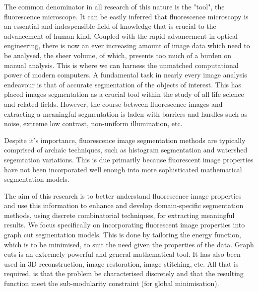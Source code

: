 The common denominator in all research of this nature is the "tool", the fluorescence microscope. 
It can be easily inferred that fluorescence microscopy is an essential and indespensible field of knowledge that is crucial to the advancement of human-kind. 
Coupled with the rapid advancement in optical engineering, there is now an ever increasing amount of image data which need to be analysed, the sheer volume, of which, presents too much of a burden on manual analysis. 
This is where we can harness the unmatched computational power of modern computers. 
A fundamental task in nearly every image analysis endeavour is that of accurate segmentation of the objects of interest. 
This has placed images segmentation as a crucial tool within the study of all life science and related fields. 
However, the course between fluorescence images and extracting a meaningful segmentation is laden with barriers and hurdles such as noise, extreme low contrast, non-uniform illumination, etc.

Despite it's importance, fluorescence image segmentation methods are typically comprised of archaic techniques, such as histogram segmentation and watershed segemtation variations. 
This is due primarily because fluorescent image properties have not been incorporated well enough into more sophisticated mathematical segmentation models. 

The aim of this research is to better understand fluorescence image properties and use this information
to enhance and develop domain-specific segmentation methods, using discrete combinatorial techniques, for extracting meaningful results. 
We focus specifically on incorporating fluorescent image properties into graph cut segmentation models. 
This is done by tailoring the energy function, which is to be minimised, to suit the need given the properties of the data.
Graph cuts is an extremely powerful and general mathematical tool. 
It has also been used in 3D reconstruction, image restoration, image stitching, etc. 
All that is required, is that the problem be characterised discretely and that the resulting function meet the sub-modularity constraint (for global minimisation).




